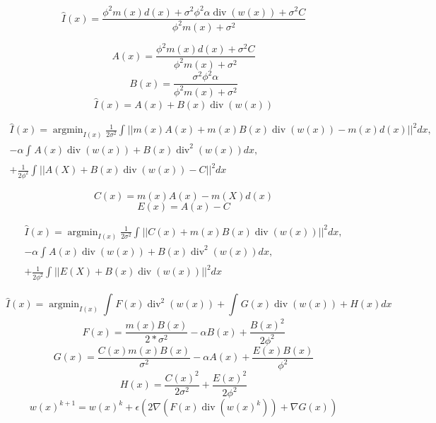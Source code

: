 \documentclass[12pt]{article}
\DeclareMathOperator*{\argmin}{argmin}
\DeclareMathOperator*{\diver}{div}
\begin{document}
\begin{equation}
\hat{I}(x) =\frac{\phi^2m(x)d(x) + \sigma^2\phi^2\alpha\diver(w(x))+\sigma^2C}{\phi^2m(x)+\sigma^2}
\label{TVI:1}
\end{equation}

\begin{equation}
A(x) = \frac{\phi^2m(x)d(x) + \sigma^2C}{\phi^2m(x)+\sigma^2}
\label{EQ:A}
\end{equation}
\begin{equation}
B(x) =\frac{\sigma^2\phi^2\alpha}{\phi^2m(x)+\sigma^2}
\label{EX:B}
\end{equation}
\begin{equation}
\hat{I}(x) =A(x) + B(x)\diver(w(x))
\label{TVI:2}
\end{equation}

\begin{equation}
\begin{aligned}
\hat{I}(x) = \argmin_{I(x)} \frac{1}{2\sigma^2} \int_{}^{}||m(x)A(x) + m(x)B(x)\diver(w(x)) - m(x)d(x)||^2 dx, \\
- \alpha\int_{}^{}A(x)\diver(w(x))+B(x)\diver^2(w(x)) dx, \\
+ \frac{1}{2\phi^2}\int_{}^{}||A(X) + B(x)\diver(w(x)) - C||^2 dx
\label{TVI:3}
\end{aligned}
\end{equation}

\begin{equation}
C(x) =m(x)A(x) - m(X)d(x)
\label{EX:C}
\end{equation}
\begin{equation}
E(x) =A(x) - C
\label{EX:E}
\end{equation}

\begin{equation}
\begin{aligned}
\hat{I}(x) = \argmin_{I(x)} \frac{1}{2\sigma^2} \int_{}^{}||C(x) + m(x)B(x)\diver(w(x))||^2 dx, \\
-\alpha\int_{}^{}A(x)\diver(w(x))+B(x)\diver^2(w(x)) dx,\\
 + \frac{1}{2\phi^2}\int_{}^{}||E(X) + B(x)\diver(w(x))||^2 dx
\label{TVI:4}
\end{aligned}
\end{equation}

\begin{equation}
\hat{I}(x) = \argmin_{I(x)} \int_{}^{}F(x)\diver^2(w(x))  + \int_{}^{} G(x)\diver(w(x)) + H(x) dx
\label{TVI:5}
\end{equation}
\begin{equation}
F(x) =\frac{m(x)B(x)}{2*\sigma^2} - \alpha{}B(x) + \frac{B(x)^2}{2\phi^2}
\label{EX:F}
\end{equation}
\begin{equation}
G(x) = \frac{C(x)m(x)B(x)}{\sigma^2} - \alpha{}A(x) + \frac{E(x)B(x)}{\phi^2}
\label{EX:G}
\end{equation}
\begin{equation}
H(x) = \frac{C(x)^2}{2\sigma^2} + \frac{E(x)^2}{2\phi^2}
\label{EX:H}
\end{equation}
\begin{equation}
w(x)^{k+1} = w(x)^k + \epsilon{}(2\nabla{}(F(x)\diver(w(x)^k)) + \nabla{}G(x))
\label{EX:W}
\end{equation}
\end{document}
